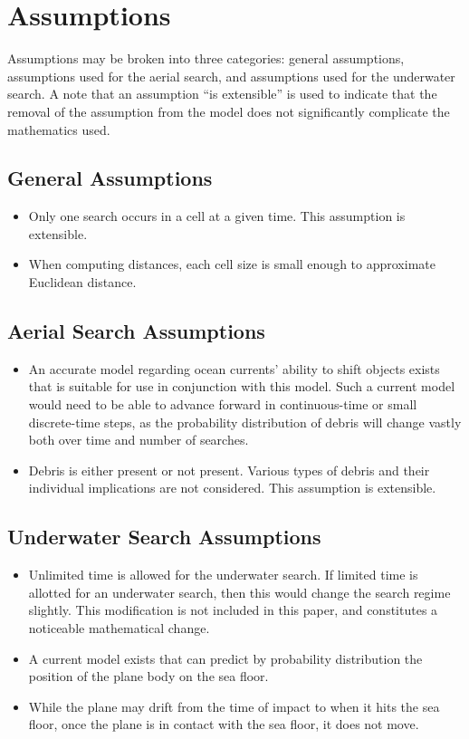 \section{Assumptions}

Assumptions may be broken into three categories: general assumptions, assumptions used for the aerial search, and assumptions used for the underwater search. A note that an assumption ``is extensible'' is used to indicate that the removal of the assumption from the model does not significantly complicate the mathematics used.

\subsection{General Assumptions}

\begin{itemize}
\item Only one search occurs in a cell at a given time. This assumption is extensible.
\item When computing distances, each cell size is small enough to approximate Euclidean distance.
\end{itemize}

\subsection{Aerial Search Assumptions}

\begin{itemize}
\item An accurate model regarding ocean currents' ability to shift objects exists that is suitable for use in conjunction with this model. Such a current model would need to be able to advance forward in continuous-time or small discrete-time steps, as the probability distribution of debris will change vastly both over time and number of searches.
\item Debris is either present or not present. Various types of debris and their individual implications are not considered. This assumption is extensible.
\end{itemize}
\subsection{Underwater Search Assumptions}

\begin{itemize}
\item Unlimited time is allowed for the underwater search. If limited time is allotted for an underwater search, then this would change the search regime slightly. This modification is not included in this paper, and constitutes a noticeable mathematical change.
\item A current model exists that can predict by probability distribution the position of the plane body on the sea floor.
\item While the plane may drift from the time of impact to when it hits the sea floor, once the plane is in contact with the sea floor, it does not move. 
\end{itemize}